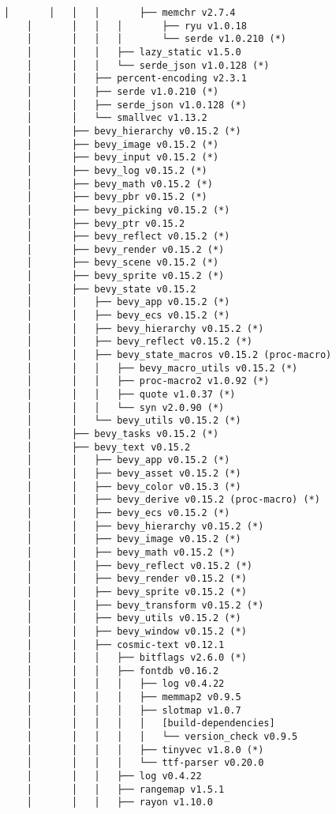 \begin{lstlisting}[style=mystyle, caption={dependencias del proyecto}, label={lst:dependencias}]
    │       │   │   │       ├── memchr v2.7.4
    │       │   │   │       ├── ryu v1.0.18
    │       │   │   │       └── serde v1.0.210 (*)
    │       │   │   ├── lazy_static v1.5.0
    │       │   │   └── serde_json v1.0.128 (*)
    │       │   ├── percent-encoding v2.3.1
    │       │   ├── serde v1.0.210 (*)
    │       │   ├── serde_json v1.0.128 (*)
    │       │   └── smallvec v1.13.2
    │       ├── bevy_hierarchy v0.15.2 (*)
    │       ├── bevy_image v0.15.2 (*)
    │       ├── bevy_input v0.15.2 (*)
    │       ├── bevy_log v0.15.2 (*)
    │       ├── bevy_math v0.15.2 (*)
    │       ├── bevy_pbr v0.15.2 (*)
    │       ├── bevy_picking v0.15.2 (*)
    │       ├── bevy_ptr v0.15.2
    │       ├── bevy_reflect v0.15.2 (*)
    │       ├── bevy_render v0.15.2 (*)
    │       ├── bevy_scene v0.15.2 (*)
    │       ├── bevy_sprite v0.15.2 (*)
    │       ├── bevy_state v0.15.2
    │       │   ├── bevy_app v0.15.2 (*)
    │       │   ├── bevy_ecs v0.15.2 (*)
    │       │   ├── bevy_hierarchy v0.15.2 (*)
    │       │   ├── bevy_reflect v0.15.2 (*)
    │       │   ├── bevy_state_macros v0.15.2 (proc-macro)
    │       │   │   ├── bevy_macro_utils v0.15.2 (*)
    │       │   │   ├── proc-macro2 v1.0.92 (*)
    │       │   │   ├── quote v1.0.37 (*)
    │       │   │   └── syn v2.0.90 (*)
    │       │   └── bevy_utils v0.15.2 (*)
    │       ├── bevy_tasks v0.15.2 (*)
    │       ├── bevy_text v0.15.2
    │       │   ├── bevy_app v0.15.2 (*)
    │       │   ├── bevy_asset v0.15.2 (*)
    │       │   ├── bevy_color v0.15.3 (*)
    │       │   ├── bevy_derive v0.15.2 (proc-macro) (*)
    │       │   ├── bevy_ecs v0.15.2 (*)
    │       │   ├── bevy_hierarchy v0.15.2 (*)
    │       │   ├── bevy_image v0.15.2 (*)
    │       │   ├── bevy_math v0.15.2 (*)
    │       │   ├── bevy_reflect v0.15.2 (*)
    │       │   ├── bevy_render v0.15.2 (*)
    │       │   ├── bevy_sprite v0.15.2 (*)
    │       │   ├── bevy_transform v0.15.2 (*)
    │       │   ├── bevy_utils v0.15.2 (*)
    │       │   ├── bevy_window v0.15.2 (*)
    │       │   ├── cosmic-text v0.12.1
    │       │   │   ├── bitflags v2.6.0 (*)
    │       │   │   ├── fontdb v0.16.2
    │       │   │   │   ├── log v0.4.22
    │       │   │   │   ├── memmap2 v0.9.5
    │       │   │   │   ├── slotmap v1.0.7
    │       │   │   │   │   [build-dependencies]
    │       │   │   │   │   └── version_check v0.9.5
    │       │   │   │   ├── tinyvec v1.8.0 (*)
    │       │   │   │   └── ttf-parser v0.20.0
    │       │   │   ├── log v0.4.22
    │       │   │   ├── rangemap v1.5.1
    │       │   │   ├── rayon v1.10.0

\end{lstlisting}
